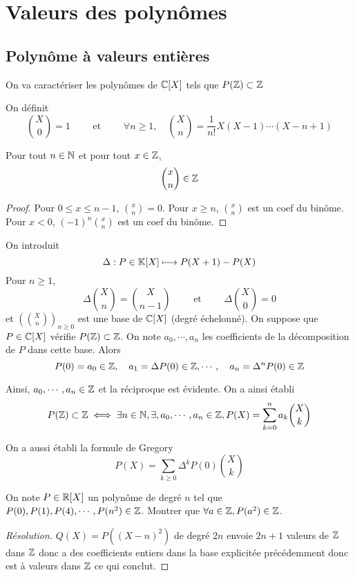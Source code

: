 \section{Valeurs des polynômes}

\subsection{Polynôme à valeurs entières}

On va caractériser les polynômes de $\mathbb C[X]$ tels que $P(\mathbb Z)\subset \mathbb Z$

On définit \[
    \binom X0=1\qquad \text{ et }\qquad \forall n\geq 1,\quad \binom Xn=\frac1{n!}X(X-1)\cdots(X-n+1)
\]

\begin{lmm}
    Pour tout $n\in\mathbb N$ et pour tout $x\in\mathbb Z$, \[
        \binom xn\in\mathbb Z
    \]
\end{lmm}

\begin{proof}
    Pour $0\leq x\leq n-1$, $\binom xn=0$. Pour $x\geq n$, $\binom xn$ est un coef du binôme. Pour $x<0$, $(-1)^n\binom xn$ est un coef du binôme.
\end{proof}

 On introduit \[
    \Delta : P\in\mathbb K[X]\longmapsto P(X+1)-P(X)
\]
Pour $n\geq 1$, \[
    \Delta\binom Xn=\binom X{n-1}\qquad\text{ et }\qquad \Delta\binom X0=0
\]
et $\displaystyle \left(\binom Xn\right)_{n\geq 0}$ est une base de $\mathbb C[X]$ (degré échelonné). On suppose que $P\in\mathbb C[X]$ vérifie $P(\mathbb Z)\subset \mathbb Z$. On note $a_0, \cdots, a_n$ les coefficients de la décomposition de $P$ dans cette base. Alors \[
    P(0)=a_0\in\mathbb Z, \quad a_1=\Delta P(0)\in\mathbb Z, \cdots, \quad a_n=\Delta^nP(0)\in\mathbb Z
\]

Ainsi, $a_0, \cdots, a_n\in\mathbb Z$ et la réciproque est évidente. On a ainsi établi \[
    P(\mathbb Z)\subset \mathbb Z\iff \exists n\in\mathbb N, \exists, a_0, \cdots, a_n\in\mathbb Z, P(X)=\sum_{k=0}^na_k\binom Xk
\]

\begin{rem}
    On a aussi établi la formule de Gregory \[
        P(X)=\sum_{k\geq 0}\Delta^kP(0)\binom Xk
    \]
\end{rem}

\begin{exo}[ENS]
    On note $P\in\mathbb R[X]$ un polynôme de degré $n$ tel que $P(0), P(1), P(4), \cdots, P(n^2)\in\mathbb Z$. Montrer que $\forall a\in\mathbb Z, P(a^2)\in \mathbb Z$.
\end{exo}

\begin{proof}[Résolution]
    $Q(X)=P((X-n)^2)$ de degré $2n$ envoie $2n+1$ valeurs de $\mathbb Z$ dans $\mathbb Z$ donc a des coefficients entiers dans la base explicitée précédemment donc est à valeurs dans $\mathbb Z$ ce qui conclut.
\end{proof}

